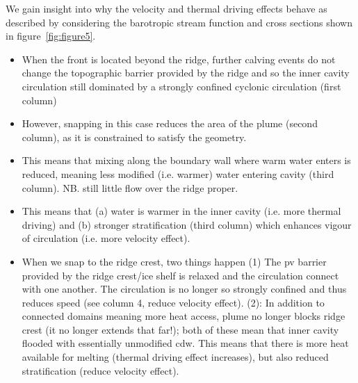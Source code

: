 \documentclass[draft]{agujournal2019}
\begin{document}
We gain insight into why the velocity and thermal driving effects behave as described by considering the barotropic stream function and cross sections shown in figure~\ref{fig:figure5}. 
\begin{itemize}
    \item When the front is located beyond the ridge, further calving events do not change the topographic barrier provided by the ridge and so the inner cavity circulation still dominated by a strongly confined cyclonic circulation (first column)
    \item However, snapping in this case reduces the area of the plume (second column), as it is constrained to satisfy the geometry. 
    \item This means that mixing along the boundary wall where warm water enters is reduced, meaning less modified (i.e. warmer) water entering cavity (third column). NB. still little flow over the ridge proper. 
    \item This means that (a) water is warmer in the inner cavity (i.e. more thermal driving) and (b) stronger stratification (third column) which enhances vigour of circulation (i.e. more velocity effect).
    \item When we snap to the ridge crest, two things happen  (1) The pv barrier provided by the ridge crest/ice shelf is relaxed and the circulation connect with one another. The circulation is no longer so strongly confined and thus reduces speed (see column 4, reduce velocity effect). (2): In addition to connected domains meaning more heat access, plume no longer blocks ridge crest (it no longer extends that far!); both of these mean that inner cavity flooded with essentially unmodified cdw. This means that there is more heat available for melting (thermal driving effect increases), but also reduced stratification (reduce velocity effect).
\end{itemize}
\end{document}
